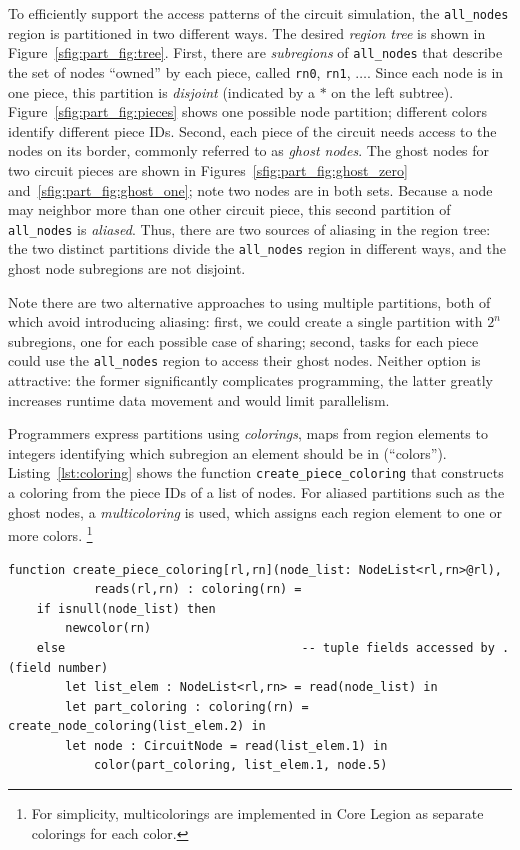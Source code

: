 To efficiently support the access patterns of the circuit simulation,
the {\tt all\_nodes} region is partitioned in two different ways.  The
desired {\em region tree} is shown in Figure~\ref{sfig:part_fig:tree}.
First, there are {\em subregions} of {\tt all\_nodes} that describe
the set of nodes ``owned'' by each piece, called {\tt rn0}, {\tt rn1},
$\ldots$. Since each node is in one piece, this partition is {\em
disjoint} (indicated by a $*$ on the left subtree).
Figure~\ref{sfig:part_fig:pieces} shows one possible node partition;
different colors identify different piece IDs.  Second, each piece of
the circuit needs access to the nodes on its border, commonly referred
to as {\em ghost nodes}.  The ghost nodes for two circuit pieces are
shown in Figures~\ref{sfig:part_fig:ghost_zero}
and~\ref{sfig:part_fig:ghost_one}; note two nodes are in both sets.
Because a node may neighbor more than one other circuit piece, this
second partition of {\tt all\_nodes} is {\em aliased}.  Thus, there
are two sources of aliasing in the region tree: the two distinct partitions
divide the {\tt all\_nodes} region in different ways, and the ghost
node subregions are not disjoint.

Note there are two alternative approaches to using multiple partitions,
both of which avoid introducing aliasing:
first, we could create a single partition with $2^n$ subregions, one for each
possible case of sharing; second, tasks for each piece could use the
{\tt all\_nodes} region to access their ghost nodes.  Neither option
is attractive: the former significantly complicates programming, the
latter greatly increases runtime data movement and would limit parallelism.

Programmers express partitions using {\em colorings},
maps from region elements to integers identifying which subregion an element
should be in (``colors'').
Listing~\ref{lst:coloring} shows the function {\tt create\_piece\_coloring}
that constructs a coloring from the piece IDs of a list of nodes.
For aliased partitions such as the ghost nodes, a {\em multicoloring}
is used, which assigns each region element to one or more colors.  
\footnote{For simplicity, multicolorings are
implemented in Core Legion as separate colorings for each color.}

\begin{lstlisting}[label={lst:coloring},caption={Coloring Construction}]
function create_piece_coloring[rl,rn](node_list: NodeList<rl,rn>@rl),
            reads(rl,rn) : coloring(rn) = 
    if isnull(node_list) then
        newcolor(rn) 
    else                                 -- tuple fields accessed by .(field number)
        let list_elem : NodeList<rl,rn> = read(node_list) in
        let part_coloring : coloring(rn) = create_node_coloring(list_elem.2) in
        let node : CircuitNode = read(list_elem.1) in
            color(part_coloring, list_elem.1, node.5)
\end{lstlisting}


